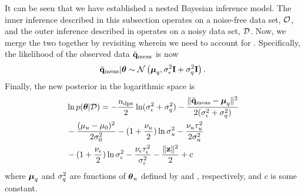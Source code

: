 It can be seen that we have established a nested Bayesian inference model. The inner inference described in this subsection operates on a noise-free data set, $\mathcal{O}$, and the outer inference described in  operates on a noisy data set, $\mathcal{D}$. Now, we merge the two together by revisiting  wherein we need to account for . Specifically, the likelihood of the observed data $\tilde{\mathbf{q}}_{\text{meas}}$ is now
\begin{equation} \elabel{noise-approximation-model}
  \mvT_\meas | \vparam \sim \gaussian{\vmean_\T}{\sigma_\noise^2 \mI + \sigma_\T^2 \mI}.
\end{equation}
Finally, the new posterior in the logarithmic space is
\begin{align}
  & \ln \f{\vparam | \Data} = -\frac{\ndcs}{2} \ln(\sigma^2_\noise + \sigma^2_\T) - \frac{\norm{\mvT_\meas - \vmean_\T}^2}{2(\sigma^2_\noise + \sigma^2_\T)} \nonumber \\
  & {} - \frac{(\mu_\u - \mu_0)^2}{2 \sigma^2_0} - (1 + \frac{\nu_\u}{2}) \ln \sigma^2_\u - \frac{\nu_\u \tau_\u^2}{2 \sigma^2_\u} \nonumber \\
  & {} - (1 + \frac{\nu_\noise}{2}) \ln \sigma^2_\noise - \frac{\nu_\noise \tau_\noise^2}{\sigma^2_\noise} - \frac{\norm{\vz}^2}{2} + c \elabel{log-posterior}
\end{align}
where ${\boldsymbol\mu}_q$ and $\sigma^2_q$ are functions of ${\boldsymbol\theta}_u$ defined by  and , respectively, and $c$ is some constant.
